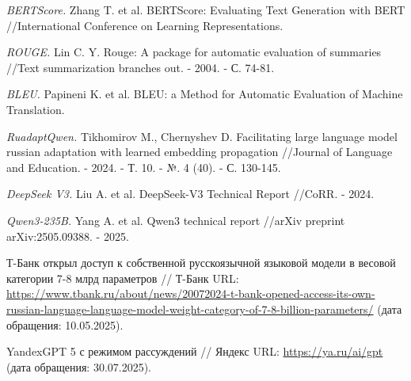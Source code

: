 \documentclass{article}
\begin{document}
\begin{thebibliography}{99}
\textit{BERTScore.}
Zhang T. et al. BERTScore: Evaluating Text Generation with BERT //International Conference on Learning Representations.

\textit{ROUGE.}
Lin C. Y. Rouge: A package for automatic evaluation of summaries //Text summarization branches out. - 2004. - С. 74-81.

\textit{BLEU.}
Papineni K. et al. BLEU: a Method for Automatic Evaluation of Machine Translation.

\textit{RuadaptQwen.}
Tikhomirov M., Chernyshev D. Facilitating large language model russian adaptation with learned embedding propagation //Journal of Language and Education. - 2024. - Т. 10. - №. 4 (40). - С. 130-145.

\textit{DeepSeek V3.}
Liu A. et al. DeepSeek-V3 Technical Report //CoRR. - 2024.

\textit{Qwen3-235B.}
Yang A. et al. Qwen3 technical report //arXiv preprint arXiv:2505.09388. - 2025.

Т-Банк открыл доступ к собственной русскоязычной языковой модели в весовой категории 7-8 млрд параметров // Т-Банк URL: \url{https://www.tbank.ru/about/news/20072024-t-bank-opened-access-its-own-russian-language-language-model-weight-category-of-7-8-billion-parameters/} (дата обращения: 10.05.2025).

YandexGPT 5 с режимом рассуждений // Яндекс URL: \url{https://ya.ru/ai/gpt} (дата обращения: 30.07.2025).

\end{thebibliography}
\end{document}
